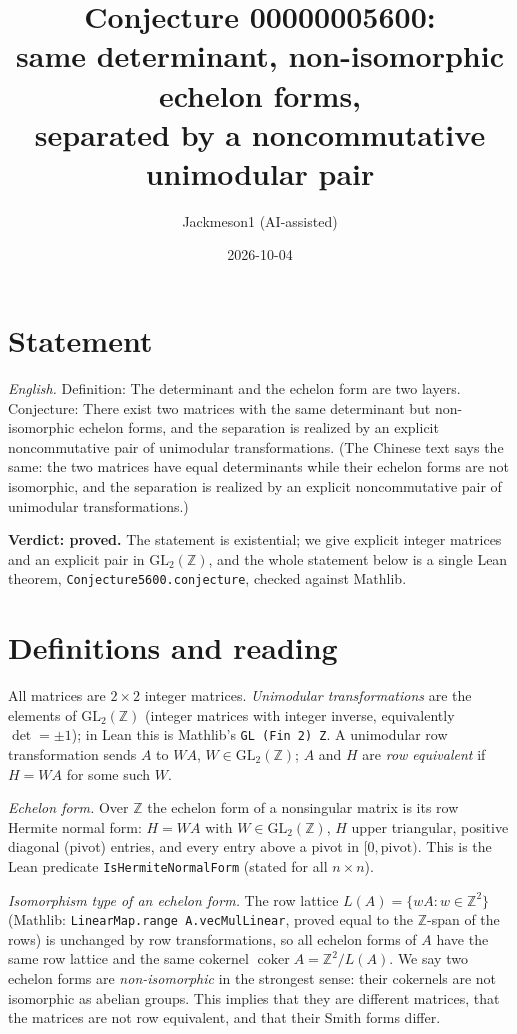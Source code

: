 \documentclass[11pt]{article}
\title{Conjecture 00000005600:\\ same determinant, non-isomorphic echelon forms,\\
separated by a noncommutative unimodular pair}
\author{Jackmeson1 (AI-assisted)}
\date{2026-10-04}
\renewcommand{\_}{\oldus\allowbreak}
\theoremstyle{remark}
\newcommand{\Z}{\mathbb{Z}}
\newcommand{\GL}{\mathrm{GL}}
\begin{document}
\maketitle

\section*{Statement}
\emph{English.} Definition: The determinant and the echelon form are two layers.
Conjecture: There exist two matrices with the same determinant but non-isomorphic
echelon forms, and the separation is realized by an explicit noncommutative pair of
unimodular transformations.
(The Chinese text says the same: the two matrices have equal determinants while their
echelon forms are not isomorphic, and the separation is realized by an explicit
noncommutative pair of unimodular transformations.)

\textbf{Verdict: proved.} The statement is existential; we give explicit integer
matrices and an explicit pair in $\GL_2(\Z)$, and the whole statement below is a single
Lean theorem, \texttt{Conjecture5600.conjecture\_5600}, checked against Mathlib.

\section{Definitions and reading}
All matrices are $2\times 2$ integer matrices. \emph{Unimodular transformations} are the
elements of $\GL_2(\Z)$ (integer matrices with integer inverse, equivalently
$\det=\pm1$); in Lean this is Mathlib's \texttt{GL (Fin 2) Z}. A unimodular row
transformation sends $A$ to $WA$, $W\in\GL_2(\Z)$; $A$ and $H$ are \emph{row equivalent}
if $H=WA$ for some such $W$.

\emph{Echelon form.} Over $\Z$ the echelon form of a nonsingular matrix is its row
Hermite normal form: $H=WA$ with $W\in\GL_2(\Z)$, $H$ upper triangular, positive
diagonal (pivot) entries, and every entry above a pivot in $[0,\text{pivot})$. This is the
Lean predicate \texttt{IsHermiteNormalForm} (stated for all $n\times n$).

\emph{Isomorphism type of an echelon form.} The row lattice $L(A)=\{wA : w\in\Z^2\}$
(Mathlib: \texttt{LinearMap.range A.vecMulLinear}, proved equal to the $\Z$-span of the
rows) is unchanged by row transformations, so all echelon forms of $A$ have the same
row lattice and the same cokernel $\operatorname{coker}A=\Z^2/L(A)$. We say two echelon
forms are \emph{non-isomorphic} in the strongest sense: their cokernels are not
isomorphic as abelian groups. This implies that they are different matrices, that the
matrices are not row equivalent, and that their Smith forms differ.
\end{document}
